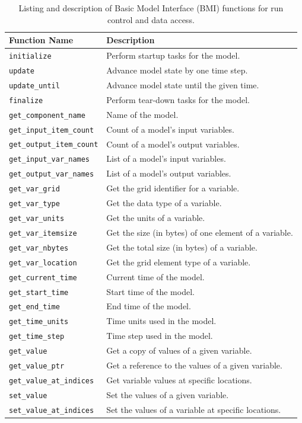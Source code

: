 \documentclass[journal abbreviation, manuscript]{copernicus}
\begin{document}
\begin{table}[htbp]
    \caption{Listing and description of Basic Model Interface (BMI) functions for run control and data access.}
    \begin{tabular}{ll}
        \hline
        Function Name &
        Description \\
        \hline\hline
        
        \verb|initialize| & Perform startup tasks for the model. \\
        \verb|update| & Advance model state by one time step. \\
        \verb|update_until| & Advance model state until the given time. \\
        \verb|finalize| & Perform tear-down tasks for the model. \\
        \verb|get_component_name| & Name of the model. \\
        \verb|get_input_item_count| & Count of a model’s input variables. \\
        \verb|get_output_item_count| & Count of a model’s output variables. \\
        \verb|get_input_var_names| & List of a model’s input variables. \\
        \verb|get_output_var_names| & List of a model’s output variables. \\
        \verb|get_var_grid| & Get the grid identifier for a variable. \\
        \verb|get_var_type| & Get the data type of a variable. \\
        \verb|get_var_units| & Get the units of a variable. \\
        \verb|get_var_itemsize| & Get the size (in bytes) of one element of a variable. \\
        \verb|get_var_nbytes| & Get the total size (in bytes) of a variable. \\
        \verb|get_var_location| & Get the grid element type of a variable. \\
        \verb|get_current_time| & Current time of the model. \\
        \verb|get_start_time| & Start time of the model. \\
        \verb|get_end_time| & End time of the model. \\
        \verb|get_time_units| & Time units used in the model. \\
        \verb|get_time_step| & Time step used in the model. \\
        \verb|get_value| & Get a copy of values of a given variable. \\
        \verb|get_value_ptr| & Get a reference to the values of a given variable. \\
        \verb|get_value_at_indices| & Get variable values at specific locations. \\
        \verb|set_value| & Set the values of a given variable. \\
        \verb|set_value_at_indices| & Set the values of a variable at specific locations. \\
    \hline
   \end{tabular}
   \label{tab:bmi1}
\end{table}
\end{document}
